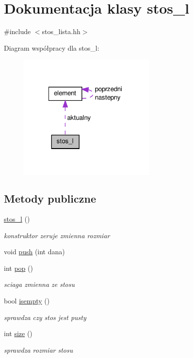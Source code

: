 \hypertarget{classstos__l}{\section{\-Dokumentacja klasy stos\-\_\-l}
\label{classstos__l}
}


{\ttfamily \#include $<$stos\-\_\-lista.\-hh$>$}



\-Diagram współpracy dla stos\-\_\-l\-:\nopagebreak
\begin{figure}[H]
\begin{center}
\leavevmode
\includegraphics[width=194pt]{classstos__l__coll__graph}
\end{center}
\end{figure}
\subsection*{\-Metody publiczne}
\begin{DoxyCompactItemize}
\item 
\hyperlink{classstos__l_a817f8251137659e6d2ec081a84ea7041}{stos\-\_\-l} ()
\begin{DoxyCompactList}\small\item\em konstruktor zeruje zmienna rozmiar \end{DoxyCompactList}\item 
void \hyperlink{classstos__l_abf3d6a7f9835928a68998e9afc569ce8}{push} (int dana)
\item 
int \hyperlink{classstos__l_a83201bb86938e636121af57fa989f763}{pop} ()
\begin{DoxyCompactList}\small\item\em sciaga zmienna ze stosu \end{DoxyCompactList}\item 
bool \hyperlink{classstos__l_adeab314853e583fd3e6acc50167fcba2}{isempty} ()
\begin{DoxyCompactList}\small\item\em sprawdza czy stos jest pusty \end{DoxyCompactList}\item 
int \hyperlink{classstos__l_a3f517d1349edbae56ca94b431baab318}{size} ()
\begin{DoxyCompactList}\small\item\em sprawdza rozmiar stosu \end{DoxyCompactList}\end{DoxyCompactItemize}
